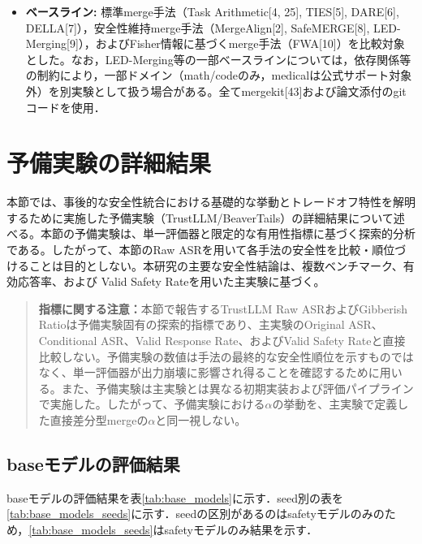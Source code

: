 \documentclass{article}
\begin{document}
\begin{itemize}
\begin{itemize}
        本文では、各手法の探索軌跡全体を用いたパレート分析に加え、比較の可読性のため代表的なmerge強度として$\alpha=0.6$の結果を提示する。ハイパーパラメータ調整を伴わないベースライン（SafeMERGE, MergeAlign等）は既定設定（$\alpha=\mathrm{N/A}$）で評価。
    \end{itemize}
    \item \textbf{ベースライン:}
    標準merge手法（Task Arithmetic[4, 25], TIES[5], DARE[6], DELLA[7]），安全性維持merge手法（MergeAlign[2], SafeMERGE[8], LED-Merging[9]），およびFisher情報に基づくmerge手法（FWA[10]）を比較対象とした。なお，LED-Merging等の一部ベースラインについては，依存関係等の制約により，一部ドメイン（math/codeのみ，medicalは公式サポート対象外）を別実験として扱う場合がある。全てmergekit[43]および論文添付のgitコードを使用．
\end{itemize}


\section{予備実験の詳細結果}
\label{app:preliminary_results}
本節では、事後的な安全性統合における基礎的な挙動とトレードオフ特性を解明するために実施した予備実験（TrustLLM/BeaverTails）の詳細結果について述べる。本節の予備実験は、単一評価器と限定的な有用性指標に基づく探索的分析である。したがって、本節のRaw ASRを用いて各手法の安全性を比較・順位づけることは目的としない。本研究の主要な安全性結論は、複数ベンチマーク、有効応答率、および Valid Safety Rateを用いた主実験に基づく。

\begin{quote}
\textbf{指標に関する注意：}本節で報告するTrustLLM Raw ASRおよびGibberish Ratioは予備実験固有の探索的指標であり、主実験のOriginal ASR、Conditional ASR、Valid Response Rate、およびValid Safety Rateと直接比較しない。予備実験の数値は手法の最終的な安全性順位を示すものではなく、単一評価器が出力崩壊に影響され得ることを確認するために用いる。また、予備実験は主実験とは異なる初期実装および評価パイプラインで実施した。したがって、予備実験における\(\alpha\)の挙動を、主実験で定義した直接差分型mergeの\(\alpha\)と同一視しない。
\end{quote}


\subsection{baseモデルの評価結果}

baseモデルの評価結果を表\ref{tab:base_models}に示す．seed別の表を\ref{tab:base_models_seeds}に示す．seedの区別があるのはsafetyモデルのみのため，\ref{tab:base_models_seeds}はsafetyモデルのみ結果を示す．
\end{document}
